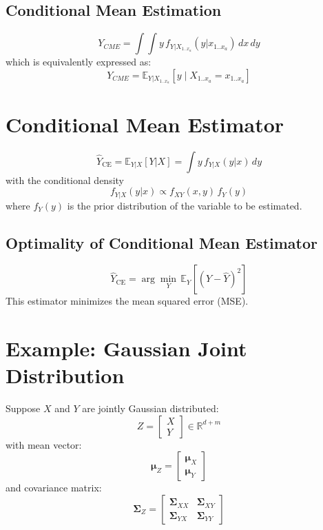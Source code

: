\documentclass[a4paper, 11pt]{article}
\begin{document}
\subsection{Conditional Mean Estimation}
\begin{equation}
Y_{CME} = \int \int y \, f_{Y|X_{1..x_a}}(y|x_{1..x_a}) \, dx \, dy
\end{equation}
which is equivalently expressed as:
\begin{equation}
Y_{CME} = \mathbb{E}_{Y|X_{1..x_a}} \left[ y \mid X_{1..x_a} = x_{1..x_a} \right]
\end{equation}

\section{Conditional Mean Estimator}
\begin{equation}
\hat{Y}_{\text{CE}} = \mathbb{E}_{Y|X}[Y|X] = \int y \, f_{Y|X}(y|x) \, dy
\end{equation}
with the conditional density
\begin{equation}
f_{Y|X}(y|x) \propto f_{XY}(x, y) \, f_Y(y)
\end{equation}
where $f_Y(y)$ is the prior distribution of the variable to be estimated.

\subsection{Optimality of Conditional Mean Estimator}
\begin{equation}
\boxed{
\hat{Y}_{\text{CE}} = \arg \min_{Y} \, \mathbb{E}_Y \left[ (Y - \hat{Y})^2 \right]
}
\end{equation}
This estimator minimizes the mean squared error (MSE).

\section{Example: Gaussian Joint Distribution}
Suppose $X$ and $Y$ are jointly Gaussian distributed:
\begin{equation}
Z = \begin{bmatrix} X \\ Y \end{bmatrix} \in \mathbb{R}^{d + m}
\end{equation}
with mean vector:
\begin{equation}
\boldsymbol{\mu}_Z = \begin{bmatrix} \boldsymbol{\mu}_X \\ \boldsymbol{\mu}_Y \end{bmatrix}
\end{equation}
and covariance matrix:
\begin{equation}
\boldsymbol{\Sigma}_Z = \begin{bmatrix} \boldsymbol{\Sigma}_{XX} & \boldsymbol{\Sigma}_{XY} \\ \boldsymbol{\Sigma}_{YX} & \boldsymbol{\Sigma}_{YY} \end{bmatrix}
\end{equation}
\end{document}
